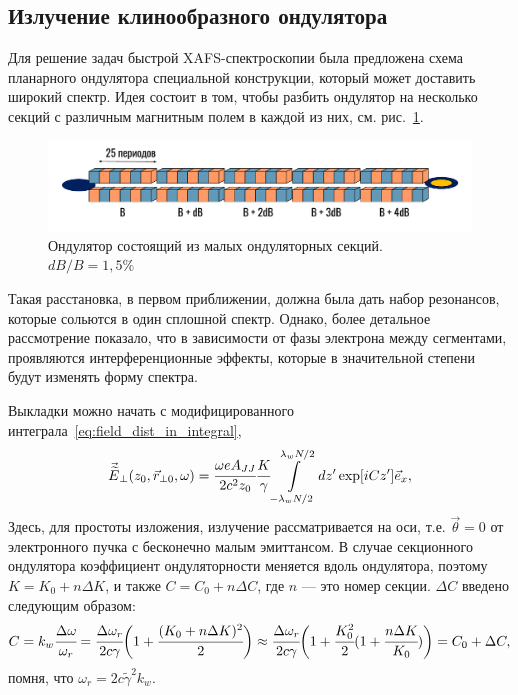 \subsection{Излучение клинообразного ондулятора}
Для решение задач быстрой  XAFS-спектроскопии была предложена схема планарного ондулятора специальной конструкции, который может доставить широкий спектр. Идея состоит в том, чтобы разбить ондулятор на несколько секций с различным магнитным полем в каждой из них, см. рис.~\ref{fig:section_und_sheme}.
\begin{figure}[h]
	\centering  
	\includegraphics[width=\textwidth]{pic/und.pdf}
	\caption{Ондулятор состоящий из малых ондуляторных секций. $dB/B = 1,5 \%$}
	\label{fig:section_und_sheme}  
\end{figure}
Такая расстановка, в первом приближении, должна была дать набор резонансов, которые сольются в один сплошной спектр. Однако, более детальное рассмотрение показало, что в зависимости от фазы электрона между сегментами, проявляются интерференционные эффекты, которые в значительной степени будут изменять форму спектра. 

Выкладки можно начать с модифицированного интеграла~\ref{eq:field_dist_in_integral}, 
\begin{equation}
\begin{array}{lcl}
\vec{\widetilde{E}}_{\bot}(z_0,  \vec{r}_{\bot 0}, \omega) =
\cfrac{\omega eA_{JJ}}{2c^2z_0}\cfrac{K}{\gamma}
\displaystyle\int\limits_{-\lambda_w N/2}^{\lambda_w N/2} dz'
\exp[iCz'] 	\vec{e}_x,
\end{array}	
\end{equation} 
Здесь, для простоты изложения, излучение рассматривается на оси, т.е. $\vec{\theta} = 0$ от электронного пучка с бесконечно малым эмиттансом. В случае секционного ондулятора коэффициент ондуляторности меняется вдоль ондулятора, поэтому $K = K_0 + n\Delta K$, и также $C = C_0 + n\Delta C$, где $n$ --- это номер секции. $\Delta {C}$ введено следующим образом:
\begin{equation}
C =k_w\cfrac{\Delta \omega}{\omega_r} = \cfrac{\Delta \omega_r}{2c\gamma}\bigg(1 + \cfrac{(K_0 + n\Delta K)^2}{2}\bigg) \approx \cfrac{\Delta \omega_r}{2c\gamma}\bigg(1 + \cfrac{K^2_0}{2}(1 + \cfrac{n\Delta K}{K_0})\bigg) = C_0 + \Delta C,
\end{equation} 
помня, что $\omega_r = 2c\widetilde{\gamma}^2k_w$.


